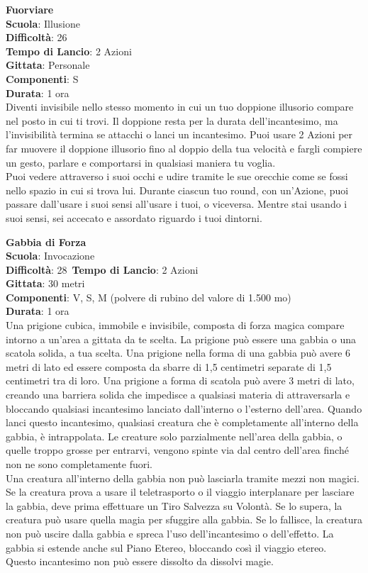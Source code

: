 \begin{multicols}{2}
\medskip\textbf{Fuorviare}\\
\textbf{Scuola}: Illusione\\
\textbf{Difficoltà}: 26\\
\textbf{Tempo di Lancio}: 2 Azioni\\
\textbf{Gittata}: Personale\\
\textbf{Componenti}: S\\
\textbf{Durata}: 1 ora\\
Diventi invisibile nello stesso momento in cui un tuo doppione illusorio compare nel posto in cui ti trovi. Il doppione resta per la durata dell'incantesimo, ma l'invisibilità termina se attacchi o lanci un incantesimo. Puoi usare 2 Azioni per far muovere il doppione illusorio fino al doppio della tua velocità e fargli compiere un gesto, parlare e comportarsi in qualsiasi maniera tu voglia.\\
Puoi vedere attraverso i suoi occhi e udire tramite le sue orecchie come se fossi nello spazio in cui si trova lui. Durante ciascun tuo round, con un'Azione, puoi passare dall'usare i suoi sensi all'usare i tuoi, o viceversa. Mentre stai usando i suoi sensi, sei accecato e assordato riguardo i tuoi dintorni. 

\medskip\textbf{Gabbia di Forza}\\
\textbf{Scuola}: Invocazione\\
\textbf{Difficoltà}: 28\
\textbf{Tempo di Lancio}: 2 Azioni\\
\textbf{Gittata}: 30 metri\\
\textbf{Componenti}: V, S, M (polvere di rubino del valore di 1.500 mo)\\
\textbf{Durata}: 1 ora\\
Una prigione cubica, immobile e invisibile, composta di forza magica compare intorno a un'area a gittata da te scelta. La prigione può essere una gabbia o una scatola solida, a tua scelta. Una prigione nella forma di una gabbia può avere 6 metri di lato ed essere composta da sbarre di 1,5 centimetri separate di 1,5 centimetri tra di loro. Una prigione a forma di scatola può avere 3 metri di lato, creando una barriera solida che impedisce a qualsiasi materia di attraversarla e bloccando qualsiasi incantesimo lanciato dall'interno o l'esterno dell'area. Quando lanci questo incantesimo, qualsiasi creatura che è completamente all'interno della gabbia, è intrappolata. Le creature solo parzialmente nell'area della gabbia, o quelle troppo grosse per entrarvi, vengono spinte via dal centro dell'area finché non ne sono completamente fuori.\\
Una creatura all'interno della gabbia non può lasciarla tramite mezzi non magici. Se la creatura prova a usare il teletrasporto o il viaggio interplanare per lasciare la gabbia, deve prima effettuare un Tiro Salvezza su Volontà. Se lo supera, la creatura può usare quella magia per sfuggire alla gabbia. Se lo fallisce, la creatura non può uscire dalla gabbia e spreca l'uso dell'incantesimo o dell'effetto. La gabbia si estende anche sul Piano Etereo, bloccando così il viaggio etereo.\\
Questo incantesimo non può essere dissolto da dissolvi magie.


\end{multicols}

